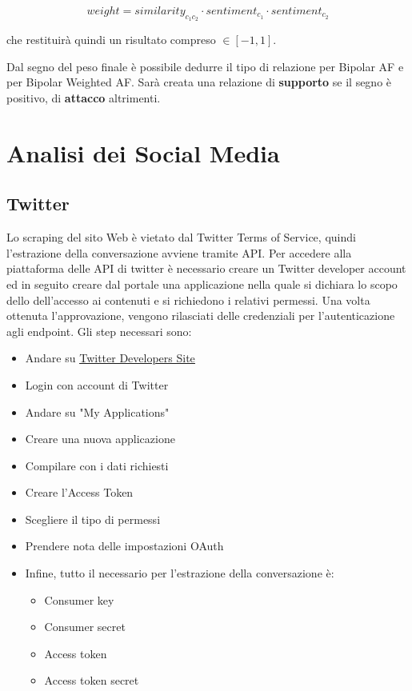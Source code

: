 $$weight = similarity_{c_1 c_2} \cdot sentiment_{c_1} \cdot sentiment_{c_2}$$

che restituirà quindi un risultato compreso $\in [-1, 1]$.

Dal segno del peso finale è possibile dedurre il tipo di relazione per Bipolar AF e per Bipolar Weighted AF. Sarà creata una relazione di \textbf{supporto} se il segno è positivo, di \textbf{attacco} altrimenti. 

\section{Analisi dei Social Media}
\label{section:data_sources}

\subsection {Twitter} %

Lo scraping del sito Web è vietato dal Twitter Terms of Service, quindi l'estrazione della conversazione avviene tramite API. Per accedere alla piattaforma delle API di twitter è necessario creare un Twitter developer account ed in seguito creare dal portale una applicazione nella quale si dichiara lo scopo dello dell'accesso ai contenuti e si richiedono i relativi permessi. Una volta ottenuta l'approvazione, vengono rilasciati delle credenziali per l'autenticazione agli endpoint. Gli step necessari sono:
  

\begin{itemize}  
    \item Andare su {\color{blue}\underline{\href{https://.dev.twitter.com}{Twitter Developers Site}}}
    \item Login con account di Twitter
    \item Andare su "My Applications"
    \item Creare una nuova applicazione
    \item Compilare con i dati richiesti
    \item Creare l'Access Token
    \item Scegliere il tipo di permessi
    \item Prendere nota delle impostazioni OAuth
    \item Infine, tutto il necessario per l'estrazione della conversazione è: \begin{itemize}
        \item Consumer key
        \item Consumer secret
        \item Access token
        \item Access token secret
    \end{itemize}
\end{itemize}

